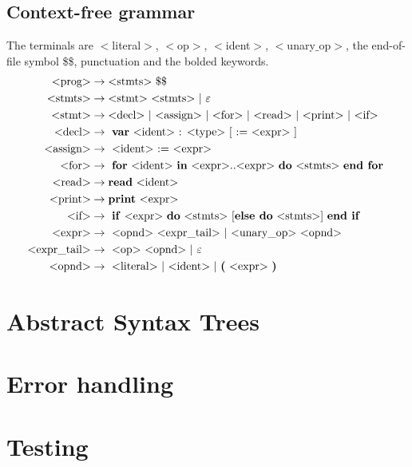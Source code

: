 \documentclass[a4paper]{article}
\begin{document}
\subsection{Context-free grammar}


\newcommand{\cfgvar}[1]{$<$#1$>$}
\newcommand{\cfgrule}[2]{\text{\cfgvar{#1}} &\rightarrow \text{#2}}
\newcommand{\cfgterm}[1]{\textbf{#1}}
The terminals are \cfgvar{literal}, \cfgvar{op}, \cfgvar{ident}, 
\cfgvar{unary$\_$op}, the end-of-file symbol \$\$, punctuation 
and the bolded keywords.
\begin{align*}
  \cfgrule{prog}{\cfgvar{stmts} \$\$} \\
  \cfgrule{stmts}{\cfgvar{stmt} \cfgvar{stmts} $\mid$ $\varepsilon$} \\
  \cfgrule{stmt}{\cfgvar{decl} $\mid$ 
                 \cfgvar{assign} $\mid$
                 \cfgvar{for} $\mid$ 
                 \cfgvar{read} $\mid$ 
                 \cfgvar{print} $\mid$ 
                 \cfgvar{if} } \\
  \cfgrule{decl}{
    \cfgterm{var} \cfgvar{ident} : \cfgvar{type} [ := \cfgvar{expr} ]
  } \\
  \cfgrule{assign}{
    \cfgvar{ident} := \cfgvar{expr}
  } \\
  \cfgrule{for}{
    \cfgterm{for} \cfgvar{ident} \cfgterm{in} 
    \cfgvar{expr}..\cfgvar{expr} \cfgterm{do} \cfgvar{stmts} 
    \cfgterm{end for}
  } \\
  \cfgrule{read}{\cfgterm{read} \cfgvar{ident}} \\
  \cfgrule{print}{\cfgterm{print} \cfgvar{expr}} \\ 
  \cfgrule{if}{
    \cfgterm{if} \cfgvar{expr} \cfgterm{do} \cfgvar{stmts}
    [\cfgterm{else do} \cfgvar{stmts}] \cfgterm{end if}
  } \\
  \cfgrule{expr}{ 
    \cfgvar{opnd} \cfgvar{expr$\_$tail} 
    $\mid$ \cfgvar{unary$\_$op} \cfgvar{opnd}
  } \\
  \cfgrule{expr$\_$tail}{
    \cfgvar{op} \cfgvar{opnd} $\mid$ $\varepsilon$
  } \\
  \cfgrule{opnd}{
    \cfgvar{literal} $\mid$ \cfgvar{ident} 
    $\mid$ \cfgterm{(} \cfgvar{expr} \cfgterm{)}
  } \\
\end{align*}

\section{Abstract Syntax Trees}

\section{Error handling}

\section{Testing}
\end{document}
